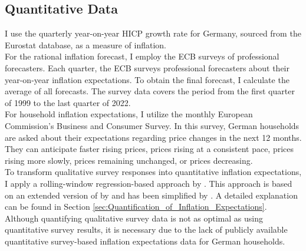 \documentclass[review]{elsarticle}
\begin{document}
\subsection{Quantitative Data} \label{sec:Quantitative_Data}

I use the quarterly year-on-year HICP growth rate for Germany, sourced from the Eurostat database, as a measure of inflation.
\\
For the rational inflation forecast, I employ the ECB surveys of professional forecasters. Each quarter, the ECB surveys professional forecasters about their year-on-year inflation expectations. To obtain the final forecast, I calculate the average of all forecasts. The survey data covers the period from the first quarter of 1999 to the last quarter of 2022.
\\
For household inflation expectations, I utilize the monthly European Commission's Business and Consumer Survey. In this survey, German households are asked about their expectations regarding price changes in the next 12 months. They can anticipate faster rising prices, prices rising at a consistent pace, prices rising more slowly, prices remaining unchanged, or prices decreasing.
\\
To transform qualitative survey responses into quantitative inflation expectations, I apply a rolling-window regression-based approach by \cite{Lahiri2015}. This approach is based on an extended version of \cite{Carlson1975} by \cite{Berk1999} and has been simplified by \cite{Rosenblatt-Wisch2015}. A detailed explanation can be found in Section \ref{sec:Quantification_of_Inflation_Expectations}.
\\
Although quantifying qualitative survey data is not as optimal as using quantitative survey results, it is necessary due to the lack of publicly available quantitative survey-based inflation expectations data for German households.
\end{document}

